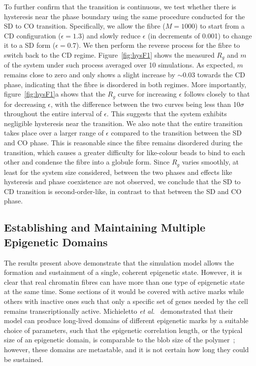 \documentclass[12pt]{article}
\newcommand{\etal}{\emph{et al.}}
\begin{document}
To further confirm that the transition is continuous, we test whether there is hysteresis near the phase boundary using the same procedure conducted for the SD to CO transition. Specifically, we allow the fibre ($M = 1000$) to start from a CD configuration ($\epsilon = 1.3$) and slowly reduce $\epsilon$ (in decrements of 0.001) to change it to a SD form ($\epsilon = 0.7$). We then perform the reverse process for the fibre to switch back to the CD regime. Figure~\ref{fig:hysF1} shows the measured $R_g$ and $m$ of the system under such process averaged over 10 simulations. As expected, $m$ remains close to zero and only shows a slight increase by $\sim 0.03$ towards the CD phase, indicating that the fibre is disordered in both regimes. More importantly, figure~\ref{fig:hysF1}a shows that the $R_g$ curve for increasing $\epsilon$ follows closely to that for decreasing $\epsilon$, with the difference between the two curves being less than 10$\sigma$ throughout the entire interval of $\epsilon$. This suggests that the system exhibits negligible hysteresis near the transition. We also note that the entire transition takes place over a larger range of $\epsilon$ compared to the transition between the SD and CO phase. This is reasonable since the fibre remains disordered during the transition, which causes a greater difficulty for like-colour beads to bind to each other and condense the fibre into a globule form. Since $R_g$ varies smoothly, at least for the system size considered, between the two phases and effects like hysteresis and phase coexistence are not observed, we conclude that the SD to CD transition is second-order-like, in contrast to that between the SD and CO phase. 

\FloatBarrier
\subsection{Establishing and Maintaining Multiple Epigenetic Domains}
The results present above demonstrate that the simulation model allows the formation and sustainment of a single, coherent epigenetic state. However, it is clear that real chromatin fibres can have more than one type of epigenetic state at the same time. Some sections of it would be covered with active marks while others with inactive ones such that only a specific set of genes needed by the cell remains transcriptionally active. Michieletto \etal ~\cite{michieletto2016} demonstrated that their model can produce long-lived domains of different epigenetic marks by a suitable choice of parameters, such that the epigenetic correlation length, or the typical size of an epigenetic domain, is comparable to the blob size of the polymer~\cite{gennes1985}; however, these domains are metastable, and it is not certain how long they could be sustained.
\end{document}
